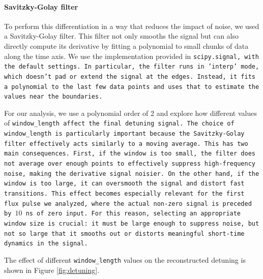 \paragraph{Savitzky-Golay filter}
To perform this differentiation in a way that reduces the impact of noise, we used a Savitzky-Golay filter. 
This filter not only smooths the signal but can also directly compute its derivative by fitting a polynomial to small chunks of data along the time axis. 
We use the implementation provided in \tt{scipy.signal}, with the default settings. 
In particular, the filter runs in \tt{'interp'} mode, which doesn't pad or extend the signal at the edges. 
Instead, it fits a polynomial to the last few data points and uses that to estimate the values near the boundaries.

For our analysis, we use a polynomial order of 2 and explore how different values of \tt{window\_length} affect the final detuning signal. 
The choice of \texttt{window\_length} is particularly important because the Savitzky-Golay filter effectively acts similarly to a moving average. 
This has two main consequences. First, if the window is too small, the filter does not average over enough points to effectively suppress high-frequency noise, making the derivative signal noisier. 
On the other hand, if the window is too large, it can oversmooth the signal and distort fast transitions. 
This effect becomes especially relevant for the first flux pulse we analyzed, where the actual non-zero signal is preceded by $10$ ns of zero input. 
For this reason, selecting an appropriate window size is crucial: it must be large enough to suppress noise, but not so large that it smooths out or distorts meaningful short-time dynamics in the signal.

The effect of different \texttt{window\_length} values on the reconstructed detuning is shown in Figure \ref{fig:detuning}.

